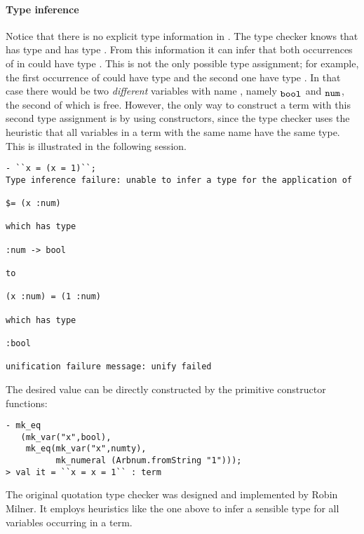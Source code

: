 \paragraph {Type inference}
%
Notice that there is no explicit type information in
.  The \HOL{} type checker knows that  has
type  and \holtxt{+} has type .
From this information it can infer that both occurrences of  in
 could have type .  This is not the
only possible type assignment; for example, the first occurrence of
 could have type  and the second one have type
.  In that case there would be two \emph{different}
variables with name , namely $_{\holtxt{bool}}$ and
$_{\holtxt{num}}$, the second of which is free.  However, the
only way to construct a term with this second type assignment is by
using constructors, since the type checker uses the heuristic that all
variables in a term with the same name have the same type.  This is
illustrated in the following session.
%
\setcounter{sessioncount}{1}
\begin{session}
\begin{verbatim}
- ``x = (x = 1)``;
Type inference failure: unable to infer a type for the application of

$= (x :num)

which has type

:num -> bool

to

(x :num) = (1 :num)

which has type

:bool

unification failure message: unify failed
\end{verbatim}
\end{session}

The desired value can be directly constructed by the primitive constructor
functions:

\begin{session}
\begin{verbatim}
- mk_eq
   (mk_var("x",bool),
    mk_eq(mk_var("x",numty),
          mk_numeral (Arbnum.fromString "1")));
> val it = ``x = x = 1`` : term
\end{verbatim}
\end{session}

The original quotation type checker was designed and implemented by
Robin Milner.  It employs heuristics like the one
above to infer a sensible type for all variables occurring in a term.

